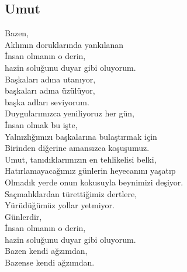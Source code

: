 \subsection{Umut}

Bazen, \\
Aklımın doruklarında yankılanan \\
İnsan olmanın o derin, \\
hazin soluğunu duyar gibi oluyorum. \\
Başkaları adına utanıyor, \\
başkaları adına üzülüyor, \\
başka adları seviyorum. \\

\noindent\newline
Duygularımızca yeniliyoruz her gün, \\
İnsan olmak bu işte, \\
Yalnızlığımızı başkalarına bulaştırmak için \\
Birinden diğerine amansızca koşuşumuz. \\

\noindent\newline
Umut, tanıdıklarımızın en tehlikelisi belki, \\
Hatırlamayacağımız günlerin heyecanını yaşatıp \\
Olmadık yerde onun kokusuyla beynimizi deşiyor. \\
Saçmalıklardan türettiğimiz dertlere, \\
Yürüdüğümüz yollar yetmiyor. \\

\noindent\newline
Günlerdir, \\
İnsan olmanın o derin, \\
hazin soluğunu duyar gibi oluyorum. \\
Bazen kendi ağzımdan, \\
Bazense kendi ağzımdan. \\